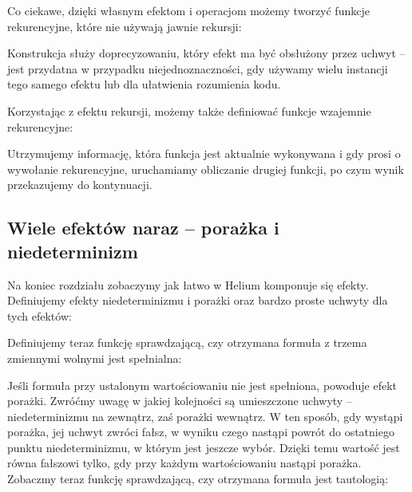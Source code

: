 

Co ciekawe, dzięki własnym efektom i operacjom możemy tworzyć funkcje rekurencyjne, które nie używają jawnie rekursji:



Konstrukcja  służy doprecyzowaniu, który efekt ma być obsłużony przez uchwyt -- jest przydatna w przypadku niejednoznaczności, gdy używamy wielu instancji tego samego efektu lub dla ułatwienia rozumienia kodu.

Korzystając z efektu rekursji, możemy także definiować funkcje wzajemnie rekurencyjne:



Utrzymujemy informację, która funkcja jest aktualnie wykonywana i gdy prosi o wywołanie rekurencyjne, uruchamiamy obliczanie drugiej funkcji, po czym wynik przekazujemy do kontynuacji.

% 
%

\subsection{Wiele efektów naraz -- porażka i niedeterminizm}

Na koniec rozdziału zobaczymy jak łatwo w Helium komponuje się efekty. Definiujemy efekty niedeterminizmu i porażki oraz bardzo proste uchwyty dla tych efektów:





Definiujemy teraz funkcję sprawdzającą, czy otrzymana formuła z trzema zmiennymi wolnymi jest spełnialna:



Jeśli formuła przy ustalonym wartościowaniu nie jest spełniona, powoduje efekt porażki. Zwróćmy uwagę w jakiej kolejności są umieszczone uchwyty -- niedeterminizmu na zewnątrz, zaś porażki wewnątrz. W ten sposób, gdy wystąpi porażka, jej uchwyt zwróci fałsz, w wyniku czego nastąpi powrót do ostatniego punktu niedeterminizmu, w którym jest jeszcze wybór. Dzięki temu wartość  jest równa fałszowi tylko, gdy przy każdym wartościowaniu nastąpi porażka. Zobaczmy teraz funkcję sprawdzającą, czy otrzymana formuła jest tautologią:

